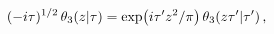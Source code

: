 \[(-i\tau)^{1/2}\mathop{\theta_{3}\/}\nolimits\!\left(z\middle|\tau\right)=%
\mathop{\exp\/}\nolimits\!\left(i\tau^{\prime}z^{2}/\pi\right)\mathop{\theta_{%
3}\/}\nolimits\!\left(z\tau^{\prime}\middle|\tau^{\prime}\right),\]